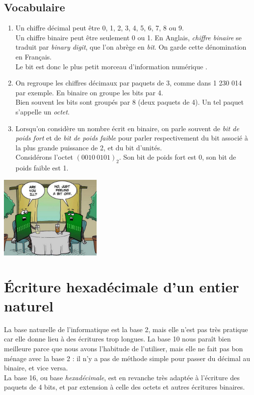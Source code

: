 \documentclass[a4paper,12pt,french]{book}
\begin{document}
\subsection{Vocabulaire}

\begin{enumerate}[--]
\item 	Un chiffre décimal peut être 0, 1, 2, 3, 4, 5, 6, 7, 8 ou 9.\\
		Un chiffre binaire peut être seulement 0 ou 1. En Anglais, \textit{chiffre binaire} se traduit par \textit{binary digit},
		que l'on abrège en \textit{bit}. On garde cette dénomination en Français.\\
		Le bit est donc \og le plus petit morceau d'information numérique \fg{}.
\item 	On regroupe les chiffres décimaux par paquets de 3, comme dans 1 230 014 par exemple.
		En binaire on groupe les bits par 4.\\
		Bien souvent les bits sont groupés par 8 (deux paquets de 4). Un tel paquet s'appelle un \textit{octet}.
\item 	Lorsqu'on considère un nombre écrit en binaire, on parle souvent de \textit{bit de poids fort} et de
\textit{bit de poids faible} pour parler respectivement du bit associé à la plus grande puissance de 2, et du bit
d'unités.\\
		Considérons l'octet $(0010\ 0101)_2$. Son bit de poids fort est 0, son bit de poids faible est 1.
\end{enumerate}
\begin{center}
\includegraphics[width=5cm]{bitjoke.jpeg}
\end{center}
\section{\'Ecriture hexadécimale d'un entier naturel}

La base \og naturelle \fg{} de l'informatique est la base 2, mais elle n'est pas très pratique car elle donne lieu à
des écritures trop longues.
La base 10 nous paraît bien meilleure parce que nous avons l'habitude de l'utiliser, mais elle ne fait pas bon ménage
avec la base 2 : il n'y a pas de méthode simple pour passer du décimal au binaire, et vice versa.\\
La base 16, ou base \textit{hexadécimale}, est en revanche très adaptée à l'écriture des paquets de 4 bits, et par
extension à celle des octets et autres écritures binaires.\\
\end{document}
